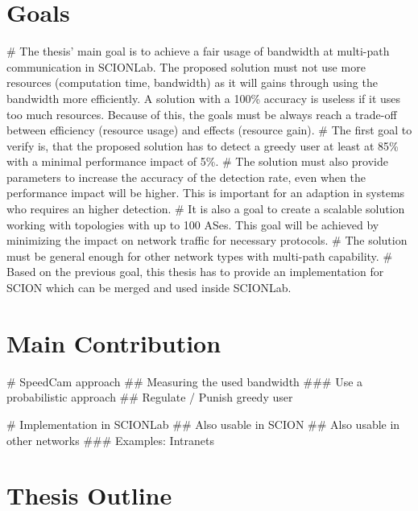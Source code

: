 \documentclass[thesis.tex]{subfiles}
\begin{document}
\section{Goals} \label{sec:intro:goals}
     \begin{easylist}
        \MyNumberedListProperties
        # The thesis' main goal is to achieve a fair usage of bandwidth at multi-path communication in SCIONLab. The proposed solution must not use more resources (computation time, bandwidth) as it will gains through using the bandwidth more efficiently. A solution with a 100\% accuracy is useless if it uses too much resources. Because of this, the goals must be always reach a trade-off between efficiency (resource usage) and effects (resource gain).        
        # The first goal to verify is, that the proposed solution has to detect a greedy user at least at 85\% with a minimal performance impact of 5\%.         
        # The solution must also provide parameters to increase the accuracy of the detection rate, even when the performance impact will be higher. This is important for an adaption in systems who requires an higher detection.
        # It is also a goal to create a scalable solution working with topologies with up to 100 ASes. This goal will be achieved by minimizing the impact on network traffic for necessary protocols.        
        # The solution must be general enough for other network types with multi-path capability.        
        # Based on the previous goal, this thesis has to provide an implementation for SCION which can be merged and used inside SCIONLab.
    \end{easylist}

\section{Main Contribution}
    \begin{easylist}
        \MyListProperties
        # SpeedCam approach
        ## Measuring the used bandwidth
        ### Use a probabilistic approach 
        ## Regulate  / Punish greedy user
        
        # Implementation in SCIONLab
        ## Also usable in SCION
        ## Also usable in other networks
        ### Examples: Intranets 
    \end{easylist}
\section{Thesis Outline}
\end{document}
